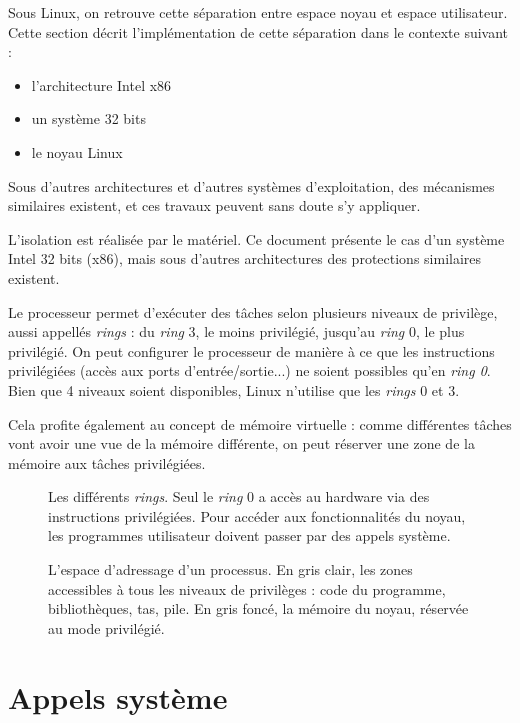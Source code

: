 Sous Linux, on retrouve cette séparation entre espace noyau et espace
utilisateur. Cette section décrit l'implémentation de cette séparation dans le
contexte suivant :

\begin{itemize}
\item l'architecture Intel x86
\item un système 32 bits
\item le noyau Linux
\end{itemize}

Sous d'autres architectures et d'autres systèmes d'exploitation, des mécanismes
similaires existent, et ces travaux peuvent sans doute s'y appliquer.

L'isolation est réalisée par le matériel. Ce document présente le cas d'un
système Intel 32 bits (x86), mais sous d'autres architectures des protections
similaires existent.

Le processeur permet d'exécuter des tâches selon plusieurs niveaux de privilège,
aussi appellés \emph{rings} : du \emph{ring} 3, le moins privilégié, jusqu'au
\emph{ring} 0, le plus privilégié. On peut configurer le processeur de manière à
ce que les instructions privilégiées (accès aux ports d'entrée/sortie...) ne
soient possibles qu'en \emph{ring 0}. Bien que 4 niveaux soient disponibles,
Linux n'utilise que les \emph{rings} 0 et 3.

Cela profite également au concept de mémoire virtuelle : comme différentes
tâches vont avoir une vue de la mémoire différente, on peut réserver une zone de
la mémoire aux tâches privilégiées.

\begin{figure}



\caption{Les différents \emph{rings}. Seul le \emph{ring} 0 a accès au hardware
via des instructions privilégiées. Pour accéder aux fonctionnalités du noyau,
les programmes utilisateur doivent passer par des appels système.}

\label{fig:rings}
\end{figure}

\begin{figure}
\centering
\fbox{
  
}

\caption{L'espace d'adressage d'un processus. En gris clair, les zones
accessibles à tous les niveaux de privilèges : code du programme, bibliothèques,
tas, pile. En gris foncé, la mémoire du noyau, réservée au mode privilégié.}

\label{fig:memmap}
\end{figure}

\section{Appels système}
